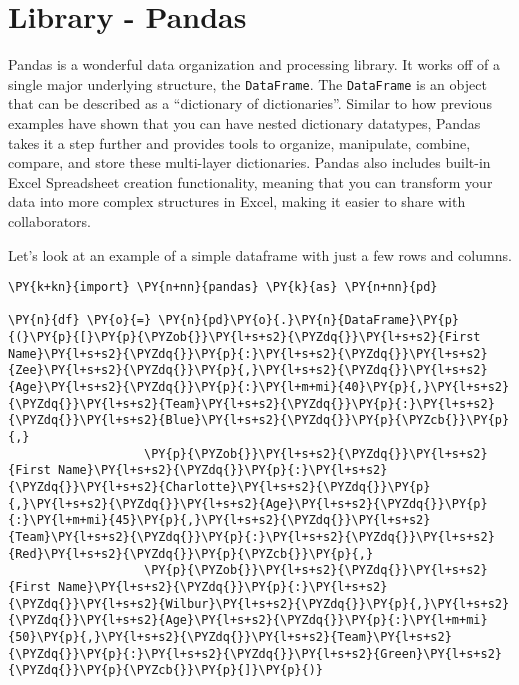 \section{Library - Pandas}
Pandas is a wonderful data organization and processing library. It works
off of a single major underlying structure, the \texttt{DataFrame}. The
\texttt{DataFrame} is an object that can be described as a ``dictionary
of dictionaries''. Similar to how previous examples have shown that you
can have nested dictionary datatypes, Pandas takes it a step further and
provides tools to organize, manipulate, combine, compare, and store
these multi-layer dictionaries. Pandas also includes built-in Excel
Spreadsheet creation functionality, meaning that you can transform your
data into more complex structures in Excel, making it easier to share
with collaborators.

Let's look at an example of a simple dataframe with just a few rows and
columns.

    \begin{tcolorbox}[breakable, size=fbox, boxrule=1pt, pad at break*=1mm,colback=cellbackground, colframe=cellborder]
\begin{Verbatim}[commandchars=\\\{\}]
\PY{k+kn}{import} \PY{n+nn}{pandas} \PY{k}{as} \PY{n+nn}{pd}

\PY{n}{df} \PY{o}{=} \PY{n}{pd}\PY{o}{.}\PY{n}{DataFrame}\PY{p}{(}\PY{p}{[}\PY{p}{\PYZob{}}\PY{l+s+s2}{\PYZdq{}}\PY{l+s+s2}{First Name}\PY{l+s+s2}{\PYZdq{}}\PY{p}{:}\PY{l+s+s2}{\PYZdq{}}\PY{l+s+s2}{Zee}\PY{l+s+s2}{\PYZdq{}}\PY{p}{,}\PY{l+s+s2}{\PYZdq{}}\PY{l+s+s2}{Age}\PY{l+s+s2}{\PYZdq{}}\PY{p}{:}\PY{l+m+mi}{40}\PY{p}{,}\PY{l+s+s2}{\PYZdq{}}\PY{l+s+s2}{Team}\PY{l+s+s2}{\PYZdq{}}\PY{p}{:}\PY{l+s+s2}{\PYZdq{}}\PY{l+s+s2}{Blue}\PY{l+s+s2}{\PYZdq{}}\PY{p}{\PYZcb{}}\PY{p}{,}
                   \PY{p}{\PYZob{}}\PY{l+s+s2}{\PYZdq{}}\PY{l+s+s2}{First Name}\PY{l+s+s2}{\PYZdq{}}\PY{p}{:}\PY{l+s+s2}{\PYZdq{}}\PY{l+s+s2}{Charlotte}\PY{l+s+s2}{\PYZdq{}}\PY{p}{,}\PY{l+s+s2}{\PYZdq{}}\PY{l+s+s2}{Age}\PY{l+s+s2}{\PYZdq{}}\PY{p}{:}\PY{l+m+mi}{45}\PY{p}{,}\PY{l+s+s2}{\PYZdq{}}\PY{l+s+s2}{Team}\PY{l+s+s2}{\PYZdq{}}\PY{p}{:}\PY{l+s+s2}{\PYZdq{}}\PY{l+s+s2}{Red}\PY{l+s+s2}{\PYZdq{}}\PY{p}{\PYZcb{}}\PY{p}{,}
                   \PY{p}{\PYZob{}}\PY{l+s+s2}{\PYZdq{}}\PY{l+s+s2}{First Name}\PY{l+s+s2}{\PYZdq{}}\PY{p}{:}\PY{l+s+s2}{\PYZdq{}}\PY{l+s+s2}{Wilbur}\PY{l+s+s2}{\PYZdq{}}\PY{p}{,}\PY{l+s+s2}{\PYZdq{}}\PY{l+s+s2}{Age}\PY{l+s+s2}{\PYZdq{}}\PY{p}{:}\PY{l+m+mi}{50}\PY{p}{,}\PY{l+s+s2}{\PYZdq{}}\PY{l+s+s2}{Team}\PY{l+s+s2}{\PYZdq{}}\PY{p}{:}\PY{l+s+s2}{\PYZdq{}}\PY{l+s+s2}{Green}\PY{l+s+s2}{\PYZdq{}}\PY{p}{\PYZcb{}}\PY{p}{]}\PY{p}{)}
\end{Verbatim}
\end{tcolorbox}

